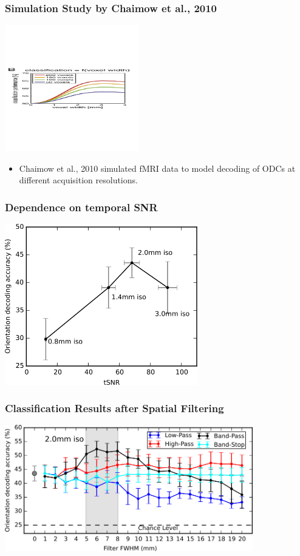 \documentclass{beamer}
\begin{document}
  \begin{frame}
    \frametitle{Simulation Study by Chaimow et al., 2010}
        \begin{center}
            \includegraphics[height=5.5cm]{../pictures/shmuel_model}
        \end{center}
        \begin{itemize}
         \item Chaimow et al., 2010 simulated fMRI data to model decoding 
         of ODCs at different acquisition resolutions.
        \end{itemize}  
    \end{frame}

  \begin{frame}
    \frametitle{Dependence on temporal SNR}
        \begin{center}
            \includegraphics[height=7cm]{../pictures/tSNR_vs_accuracy}
        \end{center}
    \end{frame}    

  \begin{frame}
    \frametitle{Classification Results after Spatial Filtering}
        \begin{center}
            \includegraphics[height=5.5cm]{../pictures/spatial_smoothing}
        \end{center}
    \end{frame} 
\end{document}
